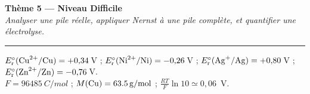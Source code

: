 \documentclass[11pt,a4paper]{article}
\newcommand{\Ered}{\ensuremath{E_{\mathrm{r}}^{\circ}}}
\begin{document}
\begin{center}
{\LARGE\bfseries\color{primarydark}Thème 5 — Niveau Difficile}\\[2pt]
{\small\itshape Analyser une pile réelle, appliquer Nernst à une pile complète, et quantifier une électrolyse.}\\[-4pt]
{\color{primary}\rule{\textwidth}{1pt}}
\end{center}

\begin{donnees}
\centering\small
$\Ered(\ce{Cu^{2+}}/\ce{Cu})=+0{,}34$\,V ; $\Ered(\ce{Ni^{2+}}/\ce{Ni})=-0{,}26$\,V ;
$\Ered(\ce{Ag+}/\ce{Ag})=+0{,}80$\,V ; $\Ered(\ce{Zn^{2+}}/\ce{Zn})=-0{,}76$\,V.\\
$F=\SI{96485}{C\per mol}$ ; $M(\ce{Cu})=\SI{63.5}{g\per mol}$ ; $\frac{RT}{F}\ln 10 \simeq 0{,}06$~V.
\end{donnees}
\end{document}
